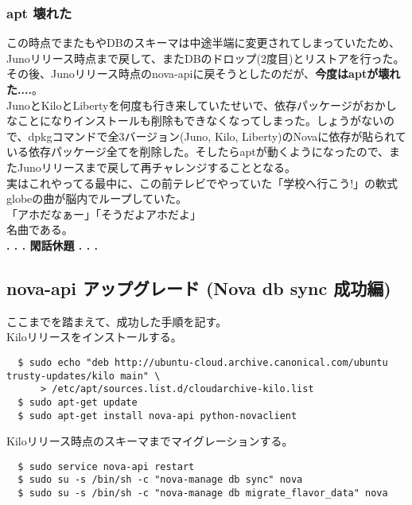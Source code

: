 \documentclass[9pt,b5paper,tombo,openany]{jsbook}
\begin{document}
\subsubsection{apt 壊れた}
この時点でまたもやDBのスキーマは中途半端に変更されてしまっていたため、Junoリリース時点まで戻して、またDBのドロップ(2度目)とリストアを行った。その後、Junoリリース時点のnova-apiに戻そうとしたのだが、\textbf{今度はaptが壊れた....}。\\[1ex]

JunoとKiloとLibertyを何度も行き来していたせいで、依存パッケージがおかしなことになりインストールも削除もできなくなってしまった。しょうがないので、dpkgコマンドで全3バージョン(Juno, Kilo, Liberty)のNovaに依存が貼られている依存パッケージ全てを削除した。そしたらaptが動くようになったので、またJunoリリースまで戻して再チャレンジすることとなる。\\[1ex]

実はこれやってる最中に、この前テレビでやっていた「学校へ行こう!」の軟式globeの曲が脳内でループしていた。\\[1ex]

\noindent
「アホだなぁー」「そうだよアホだよ」\\[1ex]

\noindent
名曲である。\\[1ex]

\noindent
\textbf{. . . 閑話休題 . . .}


\subsection{nova-api アップグレード (Nova db sync 成功編)}
\noindent
ここまでを踏まえて、成功した手順を記す。\\[1ex]

\noindent
Kiloリリースをインストールする。

\begin{lstlisting}
  $ sudo echo "deb http://ubuntu-cloud.archive.canonical.com/ubuntu trusty-updates/kilo main" \
      > /etc/apt/sources.list.d/cloudarchive-kilo.list
  $ sudo apt-get update
  $ sudo apt-get install nova-api python-novaclient
\end{lstlisting}

\noindent
Kiloリリース時点のスキーマまでマイグレーションする。
\begin{lstlisting}
  $ sudo service nova-api restart
  $ sudo su -s /bin/sh -c "nova-manage db sync" nova
  $ sudo su -s /bin/sh -c "nova-manage db migrate_flavor_data" nova
\end{lstlisting}
\end{document}
